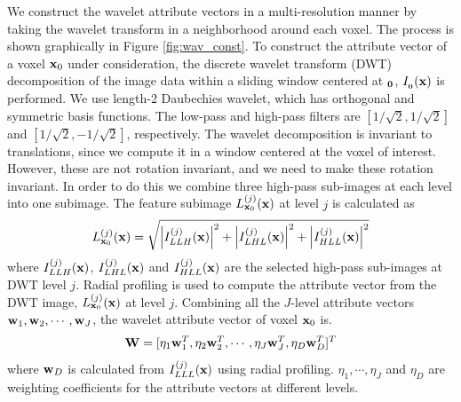 We construct the wavelet attribute vectors in a multi-resolution manner by taking the wavelet transform in a neighborhood around each voxel. The process is shown graphically in Figure \ref{fig:wav_const}. To construct the attribute vector of a voxel $\mathbf{x}_0$ under consideration, the discrete wavelet transform (DWT) decomposition of the image data within a sliding window centered at $\bf_0$, $I_{\bf_0}(\mathbf{x})$ is performed. We use length-2 Daubechies wavelet, which has orthogonal and symmetric basis functions. The low-pass and high-pass filters are $[1/\sqrt{2}, 1/\sqrt{2}]$ and $[1/\sqrt{2}, -1/\sqrt{2}]$, respectively. The wavelet decomposition is invariant to translations, since we compute it in a window centered  at the voxel of interest. However, these are not rotation invariant, and we need to make these rotation invariant. In order to do this we combine three high-pass sub-images at each level into one subimage. The feature subimage $L_{\mathbf{x}_0}^{(j)}(\mathbf{x})$ at level $j$ is calculated as
\[
L_{\mathbf{x}_0}^{(j)}(\mathbf{x}) = \sqrt{\left|I_{LLH}^{(j)}(\mathbf{x})\right|^2 + \left|I_{LHL}^{(j)}(\mathbf{x})\right|^2 + \left|I_{HLL}^{(j)}(\mathbf{x})\right|^2}
\]
where $I_{LLH}^{(j)}(\mathbf{x})$, $I_{LHL}^{(j)}(\mathbf{x})$ and $I_{HLL}^{(j)}(\mathbf{x})$ are the selected high-pass sub-images at DWT level $j$. Radial profiling is used to compute the attribute vector from the DWT image, $L_{\mathbf{x}_0}^{(j)}(\mathbf{x})$ at level $j$. Combining all the $J$-level attribute vectors $\mathbf{w}_1, \mathbf{w}_2, \cdots, \mathbf{w}_J$, the wavelet attribute vector of voxel $\mathbf{x}_0$ is.
\[
\mathbf{W} = [\eta_1\mathbf{w}_1^T, \eta_2\mathbf{w}_2^T, \cdots, \eta_J\mathbf{w}_J^T, \eta_D\mathbf{w}_D^T]^T
\]
where $\mathbf{w}_D$ is calculated from $I_{LLL}^{(j)}(\mathbf{x})$ using radial profiling. $\eta_1,\cdots, \eta_J$ and  $\eta_D$ are weighting coefficients for the attribute vectors at different levels.

